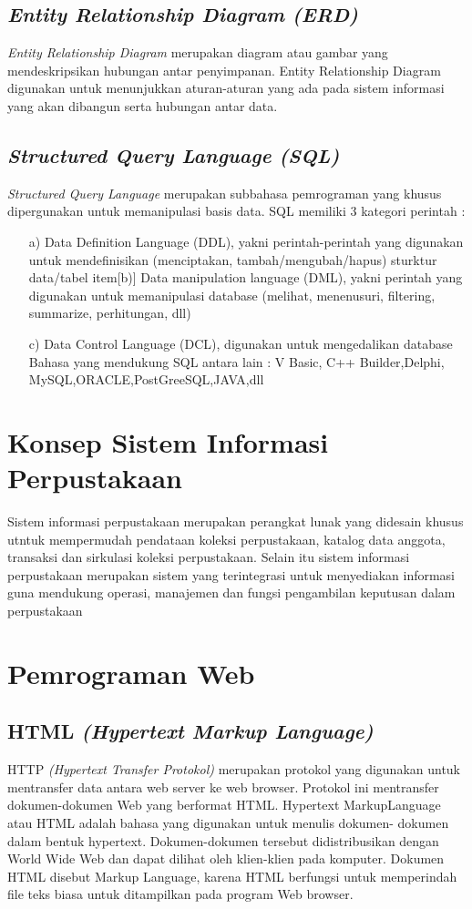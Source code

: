\documentclass{jtetiproposalskripsi}
\begin{document}
\subsection{\textit{Entity Relationship Diagram (ERD)} }
\textit{Entity Relationship Diagram} merupakan diagram atau gambar yang mendeskripsikan hubungan antar penyimpanan. Entity Relationship Diagram digunakan untuk menunjukkan aturan-aturan yang ada pada sistem informasi yang akan dibangun serta hubungan antar data. 

\subsection{\textit{Structured Query Language (SQL)} }
\textit{Structured Query Language} merupakan subbahasa pemrograman yang khusus dipergunakan untuk memanipulasi basis data. SQL memiliki 3 kategori perintah :
\begin{itemize}
\item[a)]Data Definition Language (DDL), yakni perintah-perintah yang digunakan untuk mendefinisikan (menciptakan, tambah/mengubah/hapus) sturktur data/tabel 
item[b)]	Data manipulation language (DML), yakni perintah yang digunakan untuk memanipulasi database (melihat, menenusuri, filtering, summarize, perhitungan, dll) 
\item[c)]	Data Control Language (DCL), digunakan untuk mengedalikan database Bahasa yang mendukung SQL antara lain : V Basic, C++ Builder,Delphi, MySQL,ORACLE,PostGreeSQL,JAVA,dll 
\end{itemize} 

\section{Konsep Sistem Informasi Perpustakaan }
Sistem informasi perpustakaan merupakan perangkat lunak yang didesain khusus utntuk mempermudah pendataan koleksi perpustakaan, katalog data anggota, transaksi dan sirkulasi koleksi perpustakaan. Selain itu sistem informasi perpustakaan merupakan sistem yang terintegrasi untuk menyediakan informasi guna mendukung operasi, manajemen dan fungsi pengambilan keputusan dalam perpustakaan
\section{Pemrograman Web }
\subsection{HTML \textit{(Hypertext Markup Language)}}
HTTP \textit{(Hypertext Transfer Protokol)} merupakan protokol yang digunakan untuk mentransfer data antara web server ke web browser. Protokol ini mentransfer dokumen-dokumen Web yang berformat HTML. Hypertext MarkupLanguage atau HTML adalah bahasa yang digunakan untuk menulis dokumen- dokumen dalam bentuk hypertext. Dokumen-dokumen tersebut didistribusikan dengan World Wide Web dan dapat dilihat oleh klien-klien pada komputer. Dokumen HTML disebut Markup Language, karena HTML berfungsi untuk memperindah file teks biasa untuk ditampilkan pada program Web browser. 
\end{document}
